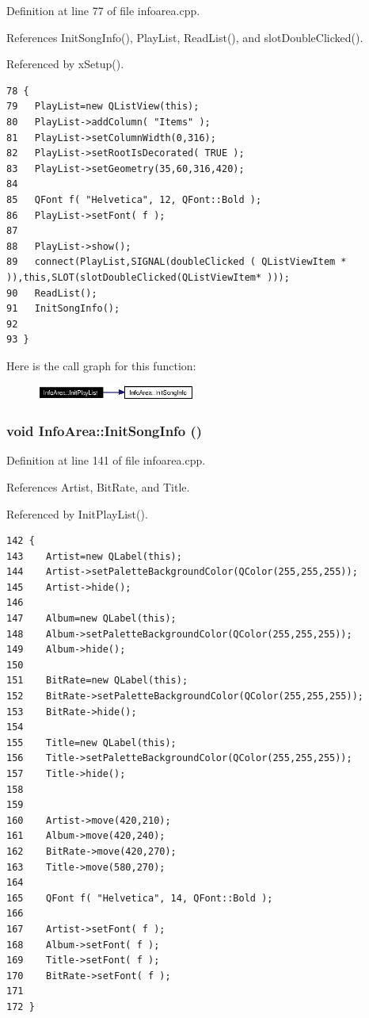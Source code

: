 Definition at line 77 of file infoarea.cpp.

References Init\-Song\-Info(), Play\-List, Read\-List(), and slot\-Double\-Clicked().

Referenced by x\-Setup().



\footnotesize\begin{verbatim}78 {
79   PlayList=new QListView(this);
80   PlayList->addColumn( "Items" );
81   PlayList->setColumnWidth(0,316);
82   PlayList->setRootIsDecorated( TRUE );
83   PlayList->setGeometry(35,60,316,420);
84   
85   QFont f( "Helvetica", 12, QFont::Bold );
86   PlayList->setFont( f );
87   
88   PlayList->show();
89   connect(PlayList,SIGNAL(doubleClicked ( QListViewItem * )),this,SLOT(slotDoubleClicked(QListViewItem* )));
90   ReadList();
91   InitSongInfo();
92   
93 }
\end{verbatim}\normalsize 


Here is the call graph for this function:\begin{figure}[H]
\begin{center}
\leavevmode
\includegraphics[width=148pt]{classInfoArea_InfoAread0_cgraph}
\end{center}
\end{figure}
\subsubsection{\setlength{\rightskip}{0pt plus 5cm}void Info\-Area::Init\-Song\-Info ()\hspace{0.3cm}{\tt  [private]}}\label{classInfoArea_InfoAread1}




Definition at line 141 of file infoarea.cpp.

References Artist, Bit\-Rate, and Title.

Referenced by Init\-Play\-List().



\footnotesize\begin{verbatim}142 {
143    Artist=new QLabel(this);
144    Artist->setPaletteBackgroundColor(QColor(255,255,255));
145    Artist->hide();
146    
147    Album=new QLabel(this);
148    Album->setPaletteBackgroundColor(QColor(255,255,255));
149    Album->hide();
150    
151    BitRate=new QLabel(this);
152    BitRate->setPaletteBackgroundColor(QColor(255,255,255));
153    BitRate->hide();
154    
155    Title=new QLabel(this);
156    Title->setPaletteBackgroundColor(QColor(255,255,255));
157    Title->hide();
158    
159    
160    Artist->move(420,210);
161    Album->move(420,240);
162    BitRate->move(420,270);
163    Title->move(580,270);
164    
165    QFont f( "Helvetica", 14, QFont::Bold );
166    
167    Artist->setFont( f );
168    Album->setFont( f );
169    Title->setFont( f );
170    BitRate->setFont( f );
171    
172 } 
\end{verbatim}\normalsize 
{}
